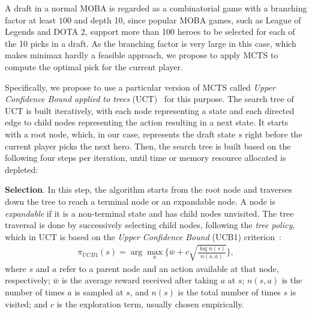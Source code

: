 
A draft in a normal MOBA is regarded as a combinatorial game with a branching factor at least $100$ and depth 10, since popular MOBA games, such as League of Legends and DOTA 2, support more than 100 heroes to be selected for each of the 10 picks in a draft. As the branching factor is very large in this case, which makes minimax hardly a feasible approach, we propose to apply MCTS to compute the optimal pick for the current player. 








Specifically, we propose to use a particular version of MCTS called \textit{Upper Confidence Bound applied to trees} (UCT)~\cite{kocsis2006bandit} for this purpose. The search tree of UCT is built iteratively, with each node representing a state and each directed edge to child nodes representing the action resulting in a next state. It starts with a root node, which, in our case, represents the draft state $s$ right before the current player picks the next hero. Then, the search tree is built based on the following four steps per iteration, until time or memory resource allocated is depleted:


\textbf{Selection}. In this step, the algorithm starts from the root node and traverses down the tree to reach a terminal node or an expandable node. A node is \textit{expandable} if it is a non-terminal state and has child nodes unvisited. The tree traversal is done by successively selecting child nodes, following the \textit{tree policy}, which in UCT is based on the \textit{Upper Confidence Bound} (UCB1) criterion~\citep{auer2002finite}:
    \begin{equation}
    \begin{aligned}
    \pi_{UCB1}(s) = \arg\max_a \Big\{ \bar{w} + c \sqrt{\frac{\log n(s)}{n(s, a)}} \Big\},
    \label{eqn:ucb}
    \end{aligned}
    \end{equation}
where $s$ and $a$ refer to a parent node and an action available at that node, respectively; $\bar{w}$ is the average reward received after taking $a$ at $s$; $n(s,a)$ is the number of times $a$ is sampled at $s$, and $n(s)$ is the total number of times $s$ is visited; and $c$ is the exploration term, usually chosen empirically. 

